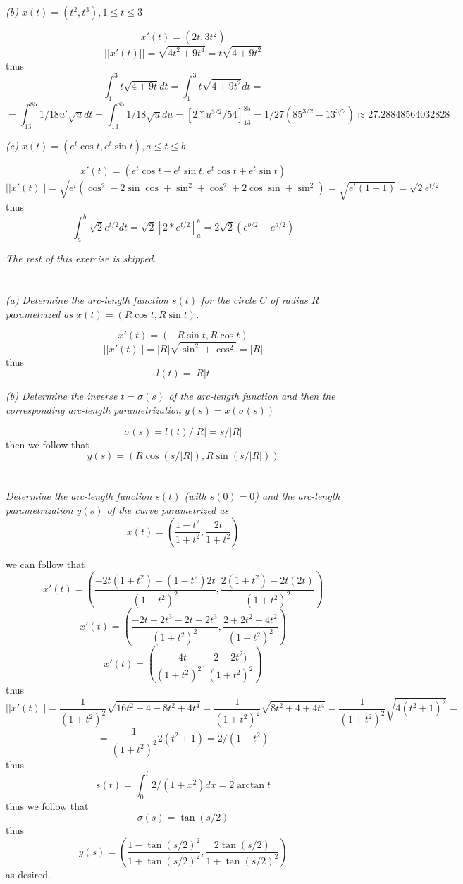 \documentclass[11pt,oneside,titlepage]{book}
\begin{document}
\textit{(b) $x(t) = (t^2, t^3), 1 \leq t \leq 3$}

$$x'(t) = (2t, 3t^2)$$
$$||x'(t)|| = \sqrt{4t^2 + 9t^4} = t\sqrt{4 + 9t^2}$$
thus
$$\int_1^3{t\sqrt{4 + 9t} dt} = \int_1^3{t\sqrt{4 + 9t^2} dt} =
$$
$$= 
\int_{13}^{85}{1/ 18 u'\sqrt{u} dt} = \int_{13}^{85}{1/ 18 \sqrt{u} du} =
\left[2 * u^{3/2}/54\right]_{13}^{85} = 1/27(85^{3/2} - 13^{3/2}) \approx 27.28848564032828$$

\textit{(c) $x(t) = (e^t \cos t, e^t \sin t), a \leq t \leq b$.}

$$x'(t) = (e^t \cos t - e^t \sin t, e^t \cos t + e^t \sin t)$$
$$||x'(t)|| = \sqrt{e^t(\cos^2 - 2 \sin \cos + \sin^2 + \cos^2 + 2 \cos \sin + \sin^2)} =
\sqrt{e^t(1 +  1 )} =  \sqrt{2} e^{t/2} $$
thus
$$\int_a^b{\sqrt{2} e^{t/2} dt} = \sqrt{2} [2  * e^{t/2}]_a^b = 2 \sqrt{2} (e^{b/2} - e^{a/2})$$

\textit{The rest of this exercise is skipped.}

\section{}

\textit{(a) Determine the arc-length function $s(t)$ for the circle $C$ of radius $R$
  parametrized as $x(t) = (R \cos t, R \sin t)$.}


$$x'(t) = (- R \sin t, R \cos t)$$
$$|| x'(t) || = |R| \sqrt{ \sin^2 + \cos^2 } = |R|$$
thus
$$l(t) = |R|t$$

\textit{(b) Determine the inverse $t = \sigma(s)$ of the arc-length function and then the
  corresponding arc-length parametrization $y(s) = x( \sigma(s))$}

$$\sigma(s) = l(t)/|R| = s/|R|$$
then we follow that
$$y(s) = (R \cos (s/|R|), R \sin (s/|R|))$$

\section{}

\textit{Determine the arc-length function $s(t)$ (with $s(0) = 0$) and the arc-length
  parametrization $y(s)$ of the curve parametrized as}
$$x(t) = (\frac{1 - t^2}{1 + t^2}, \frac{2t}{1 + t^2})$$

we can follow that
$$x'(t) = (\frac{-2t(1 + t^2) - (1 - t^2)2t}{(1 + t^2)^2},
\frac{2(1 + t^2) - 2t(2t)}{(1 + t^2)^2})$$
$$x'(t) = (\frac{-2t -2t^3 - 2t + 2t^3}{(1 + t^2)^2},
\frac{2 + 2t^2 - 4t^2}{(1 + t^2)^2})$$
$$x'(t) = (\frac{-4t}{(1 + t^2)^2},
\frac{2 - 2t^2)}{(1 + t^2)^2})$$
thus
$$||x'(t)|| = \frac{1}{(1 + t^2)^2}\sqrt{16t^2 + 4 - 8t^2 + 4t^4} =
\frac{1}{(1 + t^2)^2}\sqrt{8t^2 + 4 + 4t^4} = \frac{1}{(1 + t^2)^2}\sqrt{4(t^2 + 1)^2} = $$
$$
= \frac{1}{(1 + t^2)^2}2(t^2 + 1) = 2/(1 + t^2)
$$
thus
$$s(t) = \int_0^t{2/(1 + x^2) dx} = 2 \arctan{t}$$
thus we follow that
$$\sigma(s) = \tan(s/2)$$
thus
$$y(s) = (\frac{1 - \tan(s/2)^2}{1 + \tan(s/2)^2}, \frac{2\tan(s/2)}{1 + \tan(s/2)^2})$$
as desired.
\end{document}
